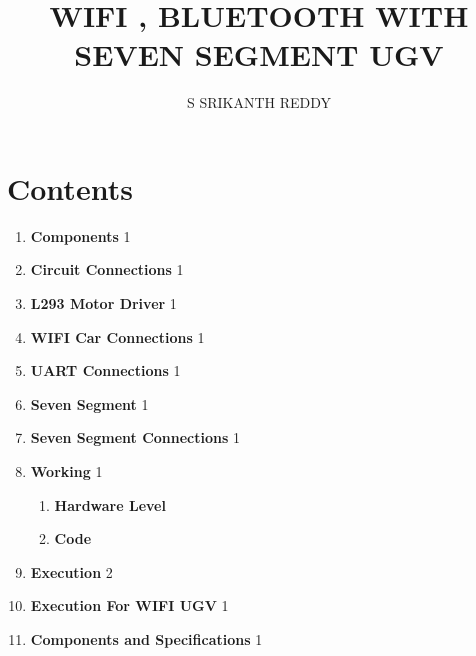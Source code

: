 \documentclass[journal,15pt,twocolumn,tikz, border=5mm]{IEEEtran}
\begin{document}
\title{ WIFI , BLUETOOTH WITH SEVEN SEGMENT UGV }

\author{S SRIKANTH REDDY}
\maketitle
\newpage
\bigskip
\renewcommand{\thefigure}{\theenumi}
\renewcommand{\thetable}{\theenumi}
\raggedright

%

\section*{Contents}
\begin{enumerate}
\item \textbf{Components} \hspace{4.1cm} 1\\
\item \textbf{Circuit Connections} \hspace{2.9cm} 1\\
\item \textbf{L293 Motor Driver} \hspace{3.0cm} 1\\
\item \textbf{WIFI Car Connections }\hspace{2.4cm} 1\\
\item \textbf{UART Connections }\hspace{3.0cm} 1\\
\item \textbf{Seven Segment}\hspace{3.8cm} 1\\
\item \textbf{Seven Segment Connections}\hspace{1.8cm} 1\\
\item \textbf{Working}\hspace{4.8cm} 1 \\
	\begin{enumerate}
	\item \textbf{Hardware Level}
	\item \textbf{Code}
	\end{enumerate}
\item \textbf{Execution} \hspace{4.45cm} 2 \\
\item \textbf{Execution For WIFI UGV} \hspace{1.9cm} 1 \\
\item \textbf{Components and Specifications} \hspace{1.2cm} 1 \\
\end{enumerate}
\end{document}
